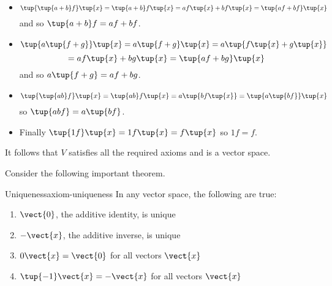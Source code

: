 \begin{solution}
\begin{itemize}
\item
\begin{equation*}
\tup{\tup{a+b} f} \tup{x} = \tup{a+b}
f\tup{x} =af\tup{x} +bf\tup{x} = \tup{
af+bf} \tup{x}
\end{equation*}
and so $\tup{a+b} f=af+bf$. 

\item
\begin{equation*}
\tup{a\tup{f+g} } \tup{x} = a\tup{f+g}
\tup{x} = a\tup{f\tup{x} +g\tup{x} }
\end{equation*}
\begin{equation*}
=af\tup{x} +bg\tup{x} = \tup{af+bg} \tup{
x}
\end{equation*}
and so $a\tup{f+g} =af+bg$. 

\item
\begin{equation*}
\tup{\tup{ab} f} \tup{x} = \tup{ab}
f\tup{x} =a\tup{bf\tup{x} } = \tup{a\tup{
bf} } \tup{x}
\end{equation*}
so $\tup{abf} =a\tup{bf}$. 

\item
Finally $\tup{1f} \tup{
x} = 1f\tup{x} =f\tup{x} $ so $1f=f$.
\end{itemize}

It follows that $V$ satisfies all the required axioms and is a vector space.
\end{solution}

Consider the following important theorem.

\begin{theorem}{Uniqueness}{axiom-uniqueness}
In any vector space, the following are true:
\begin{enumerate}
\item
$\vect{0}$, the additive identity, is unique
\item
$-\vect{x}$, the additive inverse, is unique
\item
$0\vect{x}=\vect{0}$ for all vectors $\vect{x}$
\item
$\tup{-1} \vect{x}=-\vect{x}$ for all vectors $\vect{x}$ 
\end{enumerate}
\end{theorem}

